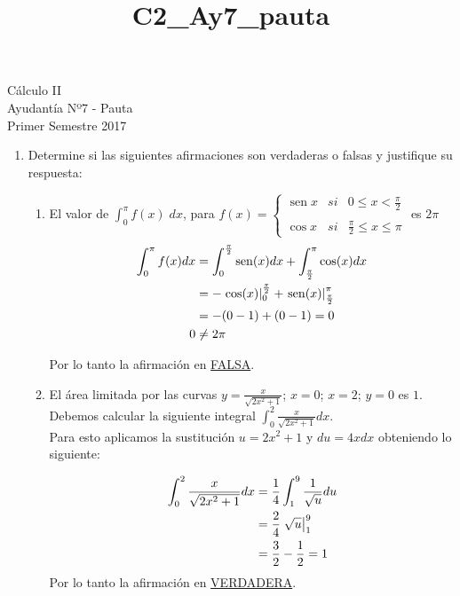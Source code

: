 \documentclass[letterpaper,10pt]{article}
\title{C2_Ay7_pauta}
\newcommand{\dis}{\displaystyle}
\def\sin{\operatorname{sen}}
\begin{document}
\begin{center}
Cálculo II\\
Ayudantía Nº7 - Pauta\\
Primer Semestre 2017
\end{center}

\begin{enumerate}
\item Determine si las siguientes afirmaciones son verdaderas o falsas y justifique su respuesta:

\begin{enumerate}[label=\emph{\alph*)}]

\item El valor de $\displaystyle \int_0^\pi f(x) \; dx$, para $f(x)= \left\{ \begin{array}{lcc}
             \sin x &   si  & 0 \leq x < \frac{\pi}{2} \\
             \\ \cos x &  si & \frac{\pi}{2} \leq x \leq \pi 
             \end{array}
   \right.$ es $2\pi$\\


\begin{align*}
\dis \int_0^\pi f(x)dx &= \int_0^\frac{\pi}{2} \sin (x)dx +\int_\frac{\pi}{2}^\pi \cos(x)dx\\
\dis  &=  -\displaystyle  \left.\cos(x)\right|_{0}^{\frac{\pi}{2}} + \displaystyle  \left.\sin(x)\right|_{\frac{\pi}{2}}^{\pi}\\
\dis  &= -(0-1) + (0-1)=0\\ 
\dis 0 &\neq	2\pi
\end{align*}

Por lo tanto la afirmación en \underline{FALSA}.

\item El área limitada por las curvas $y = \frac{x}{\sqrt{2x^2+1}}$; $x=0$; $x=2$; $y=0$ es $1$.\\

Debemos calcular la siguiente integral $\dis \int_0^2 \frac{x}{\sqrt{2x^2+1}}dx$.\\

Para esto aplicamos la sustitución $u=2x^2+1$ y $du=4xdx$ obteniendo lo siguiente:

\begin{align*}
\dis \int_0^2 \frac{x}{\sqrt{2x^2+1}}dx &= \frac{1}{4}\int_1^9 \frac{1}{\sqrt{u}}du\\
\dis  &= \displaystyle  \frac{2}{4} \left.\sqrt{u}\right|_{1}^{9}\\
\dis  &= \frac{3}{2}- \frac{1}{2} = 1\\
\end{align*}
Por lo tanto la afirmación en \underline{VERDADERA}.


\end{enumerate}
\end{enumerate}
\end{document}
